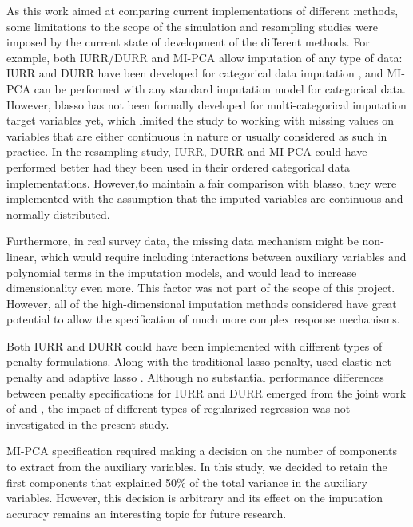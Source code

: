 	As this work aimed at comparing current implementations of different methods, some limitations
	to the scope of the simulation and resampling studies were imposed by the current state of development of 
	the different methods.
	For example, both IURR/DURR and MI-PCA allow imputation of any type of data:
	IURR and DURR have been developed for categorical data imputation \citep{dengEtAl:2016},
	and MI-PCA can be performed with any standard imputation model for categorical data.
	However, blasso has not been formally developed for multi-categorical imputation target variables yet, 
	which limited the study to working with missing values on variables that are either continuous in nature 
	or usually considered as such in practice.
	In the resampling study, IURR, DURR and MI-PCA could have performed better had they been used in their
	ordered categorical data implementations.
	However,to maintain a fair comparison with blasso, they were implemented with the assumption that the imputed 
	variables are continuous and normally distributed.

	Furthermore, in real survey data, the missing data mechanism might be non-linear, which would require
	including interactions between auxiliary variables and polynomial terms in the imputation models,
	and would lead to increase dimensionality even more.
	This factor was not part of the scope of this project. 
	However, all of the high-dimensional imputation methods considered have great potential to allow the 
	specification of much more complex response mechanisms.

	Both IURR and DURR could have been implemented with different types of penalty formulations.
	Along with the traditional lasso penalty, \cite{zhaoLong:2016} used elastic net penalty \citep{zouHastie:2005} 
	and adaptive lasso \citep{zou:2006}.
	Although no substantial performance differences between penalty specifications for IURR and DURR emerged 
	from the joint work of \cite{zhaoLong:2016} and \cite{dengEtAl:2016}, the impact of different types of 
	regularized regression was not investigated in the present study. 

	MI-PCA specification required making a decision on the number of components to extract from the auxiliary 
	variables.
	In this study, we decided to retain the first components that explained 50\% of the total variance in the 
	auxiliary variables.
	However, this decision is arbitrary and its effect on the imputation accuracy remains an interesting 
	topic for future research.

